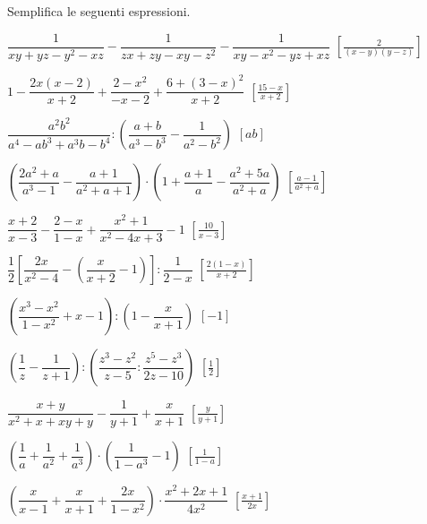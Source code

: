 \begin{esercizio}[\Ast]
\label{ese:19.38}
Semplifica le seguenti espressioni.
\begin{enumeratea}
 \item \(\dfrac{1}{xy+yz-y^{2}-xz}-\dfrac{1}{zx+zy-xy-z^{2}}-
        \dfrac{1}{xy-x^{2}-yz+xz}\)
  \hfill \(\left[\frac{2}{(x-y)(y-z)}\right]\)
 \item \(1-\dfrac{2x(x-2)}{x+2}+\dfrac{2-x^{2}}{-x-2}+
        \dfrac{6+(3-x)^{2}}{x+2}\)
  \hfill \(\left[\frac{15-x}{x+2}\right]\)
 \item \(\dfrac{a^{2}b^{2}}{a^{4}-ab^{3}+a^{3}b-b^{4}}:
        \left(\dfrac{a+b}{a^{3}-b^{3}}-\dfrac{1}{a^{2}-b^{2}}\right)\)
  \hfill \(\left[ab\right]\)
 \item \(\left(\dfrac{2a^{2}+a}{a^{3}-1}-\dfrac{a+1}{a^{2}+a+1}\right)\cdot 
        \left(1+\dfrac{a+1}{a}-\dfrac{a^{2}+5a}{a^{2}+a}\right)\)
  \hfill \(\left[\frac{a-1}{a^{2}+a}\right]\)
 \item \(\dfrac{x+2}{x-3}-\dfrac{2-x}{1-x}+\dfrac{x^{2}+1}{x^{2}-4x+3}-1\)
  \hfill \(\left[\frac{10}{x-3}\right]\)
 \item \(\dfrac{1}{2}\left[\dfrac{2x}{x^{2}-4}-
        \left(\dfrac{x}{x+2}-1\right)\right]:\dfrac{1}{2-x}\)
  \hfill \(\left[\frac{2(1-x)}{x+2}\right]\)
 \item \(\left(\dfrac{x^{3}-x^{2}}{1-x^{2}}+x-1\right):
        \left(1-\dfrac{x}{x+1}\right)\)
  \hfill \(\left[-1\right]\)
 \item \(\left(\dfrac{1}{z}-\dfrac{1}{z+1}\right):
        \left(\dfrac{z^{3}-z^{2}}{z-5}:\dfrac{z^{5}-z^{3}}{2z-10}\right)\)
  \hfill \(\left[\frac{1}{2}\right]\)
 \item \(\dfrac{x+y}{x^{2}+x+xy+y}-\dfrac{1}{y+1}+\dfrac{x}{x+1}\)
  \hfill \(\left[\frac{y}{y+1}\right]\)
 \item \(\left(\dfrac{1}{a}+\dfrac{1}{a^{2}}+\dfrac{1}{a^{3}}\right)\cdot 
        \left(\dfrac{1}{1-a^{3}}-1\right)\)
  \hfill \(\left[\frac{1}{1-a}\right]\)
 \item \(\left(\dfrac{x}{x-1}+\dfrac{x}{x+1}+\dfrac{2x}{1-x^{2}}\right)\cdot 
       {\dfrac{x^{2}+2x+1}{4x^{2}}}\)
  \hfill \(\left[\frac{x+1}{2x}\right]\)

\end{enumeratea}
\end{esercizio}

